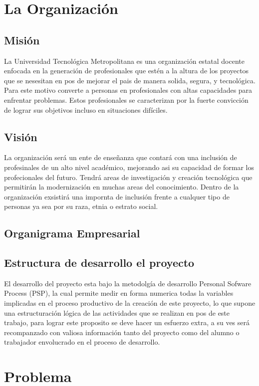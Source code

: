 \documentclass[a4paper,12pt,openany,oneside]{book}
\begin{document}
\chapter{La Organización}
\thispagestyle{empty}
\section{Misión}
La Universidad Tecnológica Metropolitana es una organización estatal docente enfocada en la generación de profesionales que estén a la altura de los proyectos que se nesesitan en pos de mejorar el pais de manera solida, segura, y tecnológica. Para este motivo converte a personas en profesionales con altas capacidades para enfrentar problemas. Estos profesionales se caracterizan por la fuerte convicción de lograr sus objetivos incluso en situaciones difíciles.
\section{Visión}
La organización será un ente de enseñanza que contará con una inclusión de profesinales de un alto nivel académico, mejorando asi su capacidad de formar los profecionales del futuro. Tendrá areas de investigación y creación tecnológica que permitirán la modernización en muchas areas del conocimiento. Dentro de la organización exsistirá una impornta de inclusión frente a cualquer tipo de personas ya sea por su raza, etnia o estrato social. 
\section{Organigrama Empresarial}

\section{Estructura de desarrollo el proyecto}
El desarrollo del proyecto esta bajo la metodolgía de desarrollo Personal Sofware Process (PSP), la cual permite medir en forma numerica todas la variables implicadas en el proceso productivo de la creación de este proyecto, lo que supone una estructuración lógica de las actividades que se realizan en pos de este trabajo, para lograr este proposito se deve hacer un esfuerzo extra, a su ves será recompanzado con valiosa información tanto del proyecto como del alumno o trabajador envolucrado en el proceso de desarrollo.
\chapter{Problema}
\thispagestyle{empty}
\end{document}
